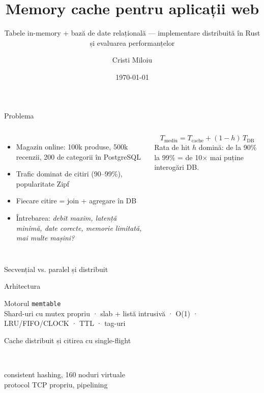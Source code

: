 \documentclass[aspectratio=169,11pt]{beamer}
\title{Memory cache pentru aplicații web}
\subtitle{Tabele in-memory + bază de date relațională — implementare distribuită în Rust și evaluarea performanțelor}
\author{Cristi Miloiu}
\institute{Proiect individual — aplicații paralele și distribuite}
\date{\today}
\begin{document}
\maketitle

\begin{frame}{Problema}
  \begin{columns}[T]
    \begin{itemize}
      \item Magazin online: \alert{100k produse}, 500k recenzii, 200 de categorii în PostgreSQL
      \item Trafic dominat de citiri (90–99\%), popularitate \alert{Zipf}
      \item Fiecare citire = join + agregare în DB
      \item Întrebarea: \emph{debit maxim, latență minimă, date corecte, memorie limitată, mai multe mașini?}
    \end{itemize}
    \[ T_{\text{mediu}} = T_{\text{cache}} + (1-h)\,T_{\text{DB}} \]
    \vspace{2mm}
    \small Rata de hit $h$ domină: de la 90\% la 99\% = de 10× mai puține interogări DB.
  \end{columns}
\end{frame}

\begin{frame}{Secvențial vs. paralel și distribuit}
  \centering\resizebox{0.85\linewidth}{!}{}
\end{frame}

\begin{frame}{Arhitectura}
  \centering\resizebox{!}{0.82\textheight}{}
\end{frame}

\begin{frame}{Motorul \texttt{memtable}}
  \centering\resizebox{0.8\linewidth}{!}{}\\[2mm]
  \footnotesize Shard-uri cu mutex propriu · slab + listă intrusivă · O(1) · LRU/FIFO/CLOCK · TTL · tag-uri
\end{frame}

\begin{frame}{Cache distribuit și citirea cu single-flight}
  \begin{columns}[c]
    \centering
    \resizebox{\linewidth}{!}{}\\[2mm]
    \scriptsize consistent hashing, 160 noduri virtuale\\ protocol TCP propriu, pipelining
    \centering
    \resizebox{\linewidth}{!}{}
  \end{columns}
\end{frame}
\end{document}
